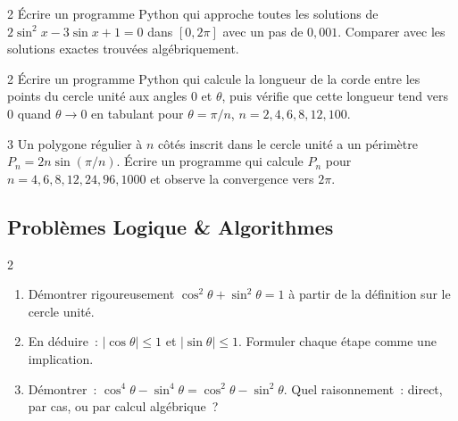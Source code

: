 \begin{bilan}
\begin{exo}{2}
\'Ecrire un programme Python qui approche toutes les solutions
de $2\sin^2x-3\sin x+1=0$ dans $[0,2\pi]$ avec un pas de $0{,}001$.
Comparer avec les solutions exactes trouv\'ees alg\'ebriquement.
\end{exo}

\begin{exo}{2}
\'Ecrire un programme Python qui calcule la longueur de la corde
entre les points du cercle unit\'e aux angles $0$ et $\theta$,
puis v\'erifie que cette longueur tend vers $0$ quand $\theta\to0$
en tabulant pour $\theta=\pi/n$, $n=2,4,6,8,12,100$.
\end{exo}

\begin{exo}{3}
Un polygone r\'egulier \`a $n$ c\^ot\'es inscrit dans le cercle unit\'e a un
p\'erim\`etre $P_n=2n\sin(\pi/n)$.
\'Ecrire un programme qui calcule $P_n$ pour $n=4,6,8,12,24,96,1000$
et observe la convergence vers $2\pi$.
\end{exo}

\subsection*{Probl\`emes Logique \& Algorithmes}

\begin{probleme}{2}
\begin{enumerate}
  \item D\'emontrer rigoureusement $\cos^2\theta+\sin^2\theta=1$
        \`a partir de la d\'efinition sur le cercle unit\'e.
  \item En d\'eduire~: $|\cos\theta|\leq1$ et $|\sin\theta|\leq1$.
        Formuler chaque \'etape comme une implication.
  \item D\'emontrer~: $\cos^4\theta-\sin^4\theta=\cos^2\theta-\sin^2\theta$.
        Quel raisonnement~: direct, par cas, ou par calcul alg\'ebrique~?
\end{enumerate}
\end{probleme}


\end{bilan}

